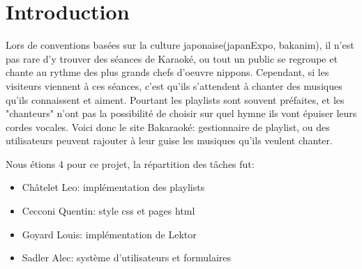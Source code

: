 \section{Introduction}
    Lors de conventions basées sur la culture japonaise(japanExpo, bakanim), il n'est pas rare d'y trouver des séances de Karaoké, ou tout un public se regroupe et chante au rythme des plus grands chefs d'oeuvre nippons.\newline
Cependant, si les visiteurs viennent à ces séances, c'est qu'ils s'attendent à chanter des musiques qu'ils connaissent et aiment. Pourtant les playlists sont souvent préfaites, et les "chanteurs" n'ont pas la possibilité de choisir sur quel hymne ils vont épuiser leurs cordes vocales. \newline
Voici donc le site Bakaraoké: gestionnaire de playlist, ou des utilisateurs peuvent rajouter à leur guise les musiques qu'ils veulent chanter. \newline

Nous étions 4 pour ce projet, la répartition des tâches fut:
\begin{itemize}
	\item Châtelet Leo: implémentation des playlists
	\item Cecconi Quentin: style css et pages html
	\item Goyard Louis: implémentation de Lektor
	\item Sadler Alec: système d'utilisateurs et formulaires
\end{itemize}
\newline



